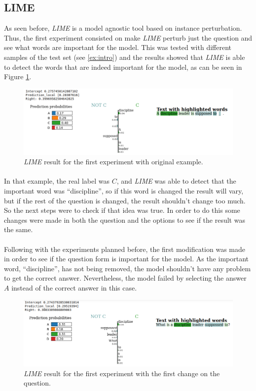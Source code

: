 \subsection{LIME}
\label{sec:LIMEResults}
\noindent As seen before, \emph{LIME} is a model agnostic tool based on instance perturbation. Thus, the first experiment consisted on make \emph{LIME} perturb just the question and see what words are important for the model. This was tested with different samples of the test set (see \ref{ex:intro}) and the results showed that \emph{LIME} is able to detect the words that are indeed important for the model, as can be seen in Figure \ref{fig:lime-result-q-1a}.
\begin{figure}[!h]
	\centering
	\includegraphics[scale=0.35]{images/lime-ex1-example1-real}
	\caption{\emph{LIME} result for the first experiment with original example.}
	\label{fig:lime-result-q-1a}
\end{figure}
\paragraph{}
In that example, the real label was $C$, and \emph{LIME} was able to detect that the important word was ``discipline'', so if this word is changed the result will vary, but if the rest of the question is changed, the result shouldn't change too much. 
So the next steps were to check if that idea was true. In order to do this some changes were made in both the question and the options to see if the result was the same.

\paragraph{}
Following with the experiments planned before, the first modification was made in order to see if the question form is important for the model. As the important word, ``discipline'', has not being removed, the model shouldn't have any problem to get the correct answer. Nevertheless, the model failed by selecting the answer $A$  instead of the correct answer in this case. 
\begin{figure}[!h]
	\centering
	\includegraphics[scale=0.35]{images/lime-ex1-example1-modA-real}
	\caption{\emph{LIME} result for the first experiment with the first change on the question.}
	\label{fig:lime-result-q-1b}
\end{figure}
